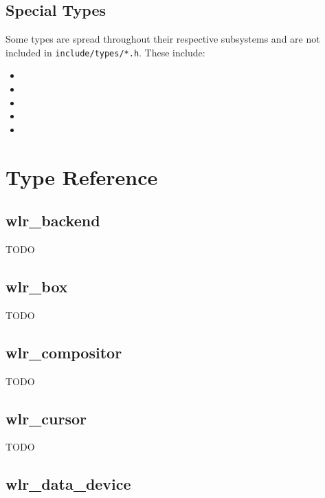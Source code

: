 \documentclass{article}
\newcommand{\code}[1]{\texttt{#1}}
\begin{document}
\subsection{Special Types}\label{special types}

Some types are spread throughout their respective subsystems and are not
included in \code{include/types/*.h}. These include:

\begin{itemize}
    \itemsep0em
    \item {}
    \item {}
    \item {}
    \item {}
    \item {}
\end{itemize}

\newpage
\section{Type Reference}\label{type reference}

\subsection{wlr_backend}\label{wlr backend}

TODO

\subsection{wlr_box}\label{wlr box}

TODO

\subsection{wlr_compositor}\label{wlr compositor}

TODO

\subsection{wlr_cursor}\label{wlr cursor}

TODO

\subsection{wlr_data_device}\label{wlr data device}
\end{document}
